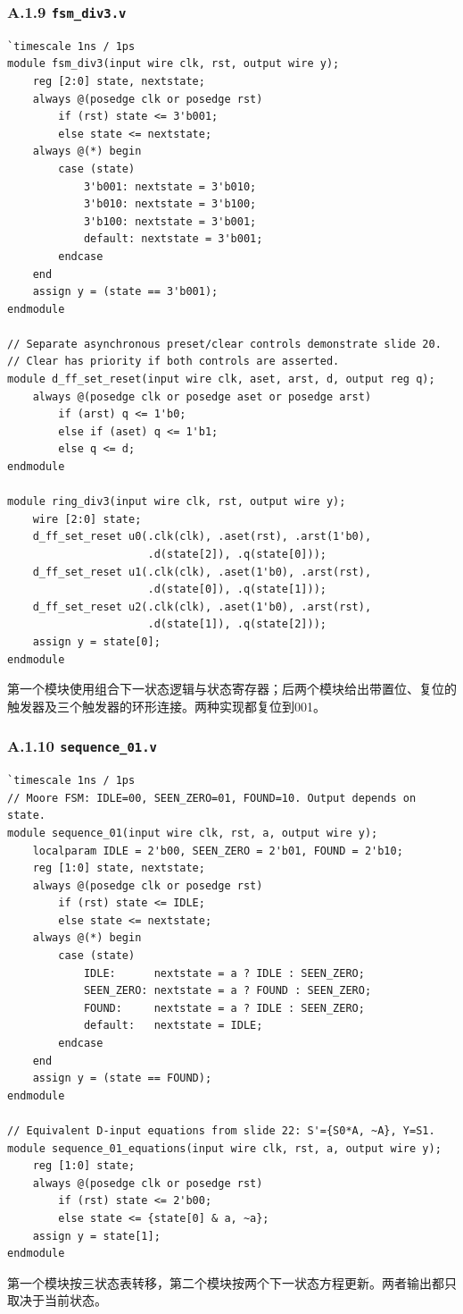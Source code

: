 \documentclass[12pt,a4paper]{ctexart}
\begin{document}
\subsubsection*{A.1.9 \texttt{fsm\_div3.v}}
\begin{lstlisting}
`timescale 1ns / 1ps
module fsm_div3(input wire clk, rst, output wire y);
    reg [2:0] state, nextstate;
    always @(posedge clk or posedge rst)
        if (rst) state <= 3'b001;
        else state <= nextstate;
    always @(*) begin
        case (state)
            3'b001: nextstate = 3'b010;
            3'b010: nextstate = 3'b100;
            3'b100: nextstate = 3'b001;
            default: nextstate = 3'b001;
        endcase
    end
    assign y = (state == 3'b001);
endmodule

// Separate asynchronous preset/clear controls demonstrate slide 20.
// Clear has priority if both controls are asserted.
module d_ff_set_reset(input wire clk, aset, arst, d, output reg q);
    always @(posedge clk or posedge aset or posedge arst)
        if (arst) q <= 1'b0;
        else if (aset) q <= 1'b1;
        else q <= d;
endmodule

module ring_div3(input wire clk, rst, output wire y);
    wire [2:0] state;
    d_ff_set_reset u0(.clk(clk), .aset(rst), .arst(1'b0),
                      .d(state[2]), .q(state[0]));
    d_ff_set_reset u1(.clk(clk), .aset(1'b0), .arst(rst),
                      .d(state[0]), .q(state[1]));
    d_ff_set_reset u2(.clk(clk), .aset(1'b0), .arst(rst),
                      .d(state[1]), .q(state[2]));
    assign y = state[0];
endmodule
\end{lstlisting}
第一个模块使用组合下一状态逻辑与状态寄存器；后两个模块给出带置位、复位的触发器及三个触发器的环形连接。两种实现都复位到001。

\subsubsection*{A.1.10 \texttt{sequence\_01.v}}
\begin{lstlisting}
`timescale 1ns / 1ps
// Moore FSM: IDLE=00, SEEN_ZERO=01, FOUND=10. Output depends on state.
module sequence_01(input wire clk, rst, a, output wire y);
    localparam IDLE = 2'b00, SEEN_ZERO = 2'b01, FOUND = 2'b10;
    reg [1:0] state, nextstate;
    always @(posedge clk or posedge rst)
        if (rst) state <= IDLE;
        else state <= nextstate;
    always @(*) begin
        case (state)
            IDLE:      nextstate = a ? IDLE : SEEN_ZERO;
            SEEN_ZERO: nextstate = a ? FOUND : SEEN_ZERO;
            FOUND:     nextstate = a ? IDLE : SEEN_ZERO;
            default:   nextstate = IDLE;
        endcase
    end
    assign y = (state == FOUND);
endmodule

// Equivalent D-input equations from slide 22: S'={S0*A, ~A}, Y=S1.
module sequence_01_equations(input wire clk, rst, a, output wire y);
    reg [1:0] state;
    always @(posedge clk or posedge rst)
        if (rst) state <= 2'b00;
        else state <= {state[0] & a, ~a};
    assign y = state[1];
endmodule
\end{lstlisting}
第一个模块按三状态表转移，第二个模块按两个下一状态方程更新。两者输出都只取决于当前状态。
\end{document}
